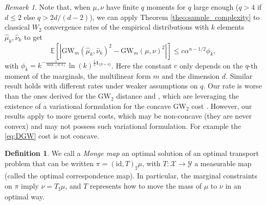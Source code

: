 \documentclass{article}
\newcommand{\Y}{\mathcal{Y}}
\newcommand{\X}{\mathcal{X}}
\newcommand{\1}{\mathbf{1}}
\newcommand{\GW}{\mathrm{GW}}
\theoremstyle{definition}
\newtheorem{definition}{Definition}
\theoremstyle{remark}
\newtheorem*{remark}{Remark}
\begin{document}
\begin{remark} Note that, when $\mu,\nu$ have finite $q$ moments for $q$ large enough ($q>4$ if $d\leq 2$ else $q>2d/(d-2)$), we can apply Theorem \ref{theo:sample_complexity} to classical $W_2$ convergence rates of the empirical distributions  with $k$ elements $\hat{\mu}_k,\hat{\nu}_k$ \cite{fournier2015rate} to get 
\[\mathbb{E}[|\GW_m(\hat{\mu}_k,\hat{\nu}_k)^2-\GW_m(\mu,\nu)^2|]\leq c \alpha^{n-1/2} \phi_k,\]
with $\phi_k = k^{-\frac{1}{\max(d,4)}}\ln(k)^{\frac{1}{2}\1_{\{d=4\}}}$. Here the constant $c$ only depends on the $q$-th moment of the marginals, the multilinear form $m$ and the dimension $d$. Similar result holds with different rates under weaker assumptions on $q$. Our rate is worse than the ones derived for the $\GW_2$ distance \cite[Theorem 4.2]{zhang2024gromov} and \cite[Theorem 3.1]{kato2025convergence}, which are leveraging the existence of a variational formulation for the concave $\GW_2$ cost \cite[Corollary 4.1]{zhang2024gromov}. However, our results apply to more general costs, which may be non-concave (they are never convex) and may not possess such variational formulation. For example the \ref{eq:DGW} cost is not concave.
\end{remark}


\begin{definition}
    We call a \emph{Monge map} an optimal solution of an optimal transport problem that can be written $\pi=(\mathrm{id},T)_\sharp\mu$, with $T:\X\to\Y$ a measurable map (called the optimal correspondence map). In particular, the marginal constraints on $\pi$ imply $\nu=T_\sharp\mu$, and $T$ represents how to move the mass of $\mu$ to $\nu$ in an optimal way.
\end{definition}
\end{document}
